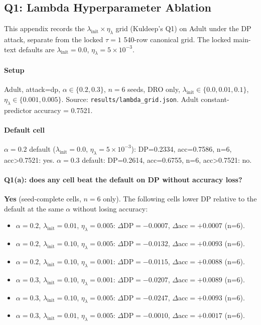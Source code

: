 \subsection{Q1: Lambda Hyperparameter Ablation}
\label{app:lambda-ablation}

This appendix records the \emph{$\lambda_{\mathrm{init}}\times\eta_{\lambda}$} grid (Kuldeep's Q1) on Adult under the DP attack, separate from the locked $\tau{=}1$ 540-row canonical grid. The locked main-text defaults are $\lambda_{\mathrm{init}}{=}0.0$, $\eta_{\lambda}{=}5\times10^{-3}$.

\paragraph{Setup}
Adult, attack=dp, $\alpha\in\{0.2,0.3\}$, $n{=}6$ seeds, DRO only, $\lambda_{\mathrm{init}}\in\{0.0,0.01,0.1\}$, $\eta_{\lambda}\in\{0.001,0.005\}$. Source: \texttt{results/lambda\_grid.json}. Adult constant-predictor accuracy = 0.7521.

\paragraph{Default cell}
$\alpha{=}0.2$ default ($\lambda_{\mathrm{init}}{=}0.0$, $\eta_{\lambda}{=}5{\times}10^{-3}$): DP=0.2334, acc=0.7586, n=6, acc>0.7521: yes.
$\alpha{=}0.3$ default: DP=0.2614, acc=0.6755, n=6, acc>0.7521: no.

\paragraph{Q1(a): does any cell beat the default on DP without accuracy loss?}
\textbf{Yes} (seed-complete cells, $n{=}6$ only). The following cells lower DP relative to the default at the same $\alpha$ without losing accuracy:
\begin{itemize}
\item $\alpha{=}0.2$, $\lambda_{\mathrm{init}}{=}0.01$, $\eta_{\lambda}{=}0.005$: $\Delta$DP$=-0.0007$, $\Delta$acc$=+0.0007$ (n=6).
\item $\alpha{=}0.2$, $\lambda_{\mathrm{init}}{=}0.10$, $\eta_{\lambda}{=}0.005$: $\Delta$DP$=-0.0132$, $\Delta$acc$=+0.0093$ (n=6).
\item $\alpha{=}0.2$, $\lambda_{\mathrm{init}}{=}0.10$, $\eta_{\lambda}{=}0.001$: $\Delta$DP$=-0.0115$, $\Delta$acc$=+0.0088$ (n=6).
\item $\alpha{=}0.3$, $\lambda_{\mathrm{init}}{=}0.10$, $\eta_{\lambda}{=}0.001$: $\Delta$DP$=-0.0207$, $\Delta$acc$=+0.0089$ (n=6).
\item $\alpha{=}0.3$, $\lambda_{\mathrm{init}}{=}0.10$, $\eta_{\lambda}{=}0.005$: $\Delta$DP$=-0.0247$, $\Delta$acc$=+0.0093$ (n=6).
\item $\alpha{=}0.3$, $\lambda_{\mathrm{init}}{=}0.01$, $\eta_{\lambda}{=}0.005$: $\Delta$DP$=-0.0010$, $\Delta$acc$=+0.0017$ (n=6).
\end{itemize}

